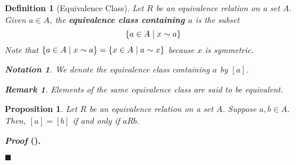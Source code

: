 \documentclass[12pt,a4paper]{article}
\newtheorem{nota}{Notation}[section]
\newtheorem{df}{Definition}[subsection]
\newtheorem{prop}{Proposition}[section]
\newcounter{nprf}[subsection]
\newtheorem*{rmk}{\indent Remark}
\newenvironment*{prf}{\par\indent\textbf{\textit{Proof} (\stepcounter{nprf}\thenprf). }\par }{\par\hfill $\blacksquare$\par}
\begin{document}
\begin{df}[Equivalence Class]\label{df4.2.5}
	Let $R$ be an equivalence relation on a set $A$. Given $a\in A$, the \textbf{equivalence class containing $a$} is the subset \[\qty{a\in A\mid x\sim a}\] Note that $\qty{a\in A\mid x\sim a}=\qty{x\in A\mid a\sim x}$ because $x$ is symmetric.
\begin{nota} We denote the equivalence class containing $a$ by $[a]$. \end{nota}
\begin{rmk} Elements of the same equivalence class are said to be \textit{equivalent}. \end{rmk}
\end{df}
\begin{framed}
\begin{prop}\label{prop4.2.1} Let $R$ be an equivalence relation on a set $A$. Suppose $a,b\in A$. Then, $[a]=[b]$ if and only if $aRb.$ \end{prop}
\begin{prf}

\end{prf}
\end{framed}
\end{document}
